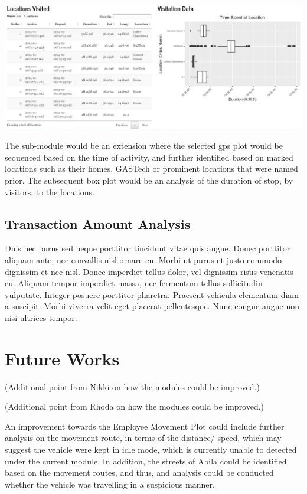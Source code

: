 \documentclass{acm_proc_article-sp}
\begin{document}
\includegraphics{img/Movement2.PNG}

The sub-module would be an extension where the selected gps plot would
be sequenced based on the time of activity, and further identified based
on marked locations such as their homes, GASTech or prominent locations
that were named prior. The subsequent box plot would be an analysis of
the duration of stop, by visitors, to the locations.

\hypertarget{transaction-amount-analysis}{%
\subsection{Transaction Amount
Analysis}\label{transaction-amount-analysis}}

Duis nec purus sed neque porttitor tincidunt vitae quis augue. Donec
porttitor aliquam ante, nec convallis nisl ornare eu. Morbi ut purus et
justo commodo dignissim et nec nisl. Donec imperdiet tellus dolor, vel
dignissim risus venenatis eu. Aliquam tempor imperdiet massa, nec
fermentum tellus sollicitudin vulputate. Integer posuere porttitor
pharetra. Praesent vehicula elementum diam a suscipit. Morbi viverra
velit eget placerat pellentesque. Nunc congue augue non nisi ultrices
tempor.

\hypertarget{future-works}{%
\section{Future Works}\label{future-works}}

(Additional point from Nikki on how the modules could be improved.)

(Additional point from Rhoda on how the modules could be improved.)

An improvement towards the Employee Movement Plot could include further
analysis on the movement route, in terms of the distance/ speed, which
may suggest the vehicle were kept in idle mode, which is currently
unable to detected under the current module. In addition, the streets of
Abila could be identified based on the movement routes, and thus, and
analysis could be conducted whether the vehicle was travelling in a
suspicious manner.
\end{document}
